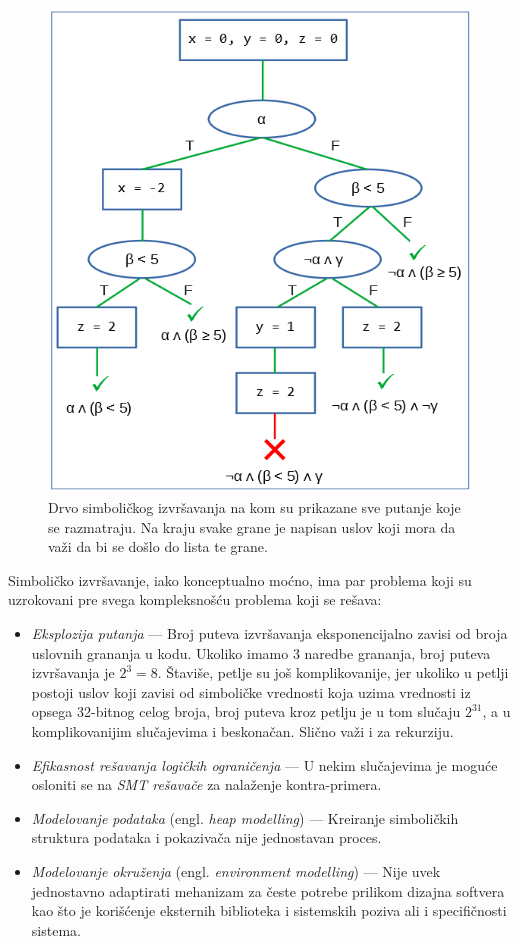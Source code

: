 \begin{figure}[h!]
\centering
\includegraphics[scale=0.7]{images/sym_tree.png}
\caption{Drvo simboličkog izvršavanja na kom su prikazane sve putanje koje se razmatraju. Na kraju svake grane je napisan uslov koji mora da važi da bi se došlo do lista te grane.}
\label{fig:SymbolicExecTree}
\end{figure}

Simboličko izvršavanje, iako konceptualno moćno, ima par problema koji su uzrokovani pre svega kompleksnošću problema koji se rešava:
\begin{itemize}
    \item \emph{Eksplozija putanja} --- Broj puteva izvršavanja eksponencijalno zavisi od broja uslovnih grananja u kodu. Ukoliko imamo 3 naredbe grananja, broj puteva izvršavanja je $2^3=8$. Štaviše, petlje su još komplikovanije, jer ukoliko u petlji postoji uslov koji zavisi od simboličke vrednosti koja uzima vrednosti iz opsega 32-bitnog celog broja, broj puteva kroz petlju je u tom slučaju $2^{31}$, a u komplikovanijim slučajevima i beskonačan. Slično važi i za rekurziju.
    \item \emph{Efikasnost rešavanja logičkih ograničenja} --- U nekim slučajevima je moguće osloniti se na \emph{SMT rešavače} \cite{SMT} za nalaženje kontra-primera.
    \item \emph{Modelovanje podataka} (engl. \emph{heap modelling}) --- Kreiranje simboličkih struktura podataka i pokazivača nije jednostavan proces.
    \item \emph{Modelovanje okruženja} (engl. \emph{environment modelling}) --- Nije uvek jednostavno adaptirati mehanizam za česte potrebe prilikom dizajna softvera kao što je korišćenje eksternih biblioteka i sistemskih poziva ali i specifičnosti sistema.
\end{itemize}

